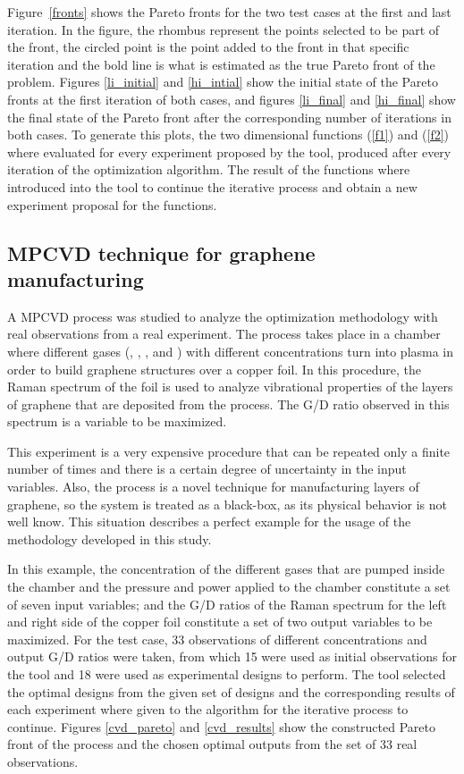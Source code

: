 \documentclass{article}
\begin{document}
Figure~\ref{fronts} shows the Pareto fronts for the two test cases at the first and last iteration. In the figure, the rhombus represent the points selected to be part of the front, the circled point is the point added to the front in that specific iteration and the bold line is what is estimated as the true Pareto front of the problem. Figures \ref{li_initial} and \ref{hi_intial} show the initial state of the Pareto fronts at the first iteration of both cases, and figures \ref{li_final} and \ref{hi_final} show the final state of the Pareto front after the corresponding number of iterations in both cases. To generate this plots, the two dimensional functions (\ref{f1}) and (\ref{f2}) where evaluated for every experiment proposed by the tool, produced after every iteration of the optimization algorithm. The result of the functions where introduced into the tool to continue the iterative process and obtain a new experiment proposal for the functions.

\subsection{MPCVD technique for graphene manufacturing}

A MPCVD process was studied to analyze the optimization methodology with real observations from a real experiment. The process takes place in a chamber where different gases (, , ,  and ) with different concentrations turn into plasma in order to build graphene structures over a copper foil. In this procedure, the Raman spectrum of the foil is used to analyze vibrational properties of the layers of graphene that are deposited from the process. The G/D ratio observed in this spectrum is a variable to be maximized.

This experiment is a very expensive procedure that can be repeated only a finite number of times and there is a certain degree of uncertainty in the input variables. Also, the process is a novel technique for manufacturing layers of graphene, so the system is treated as a black-box, as its physical behavior is not well know. This situation describes a perfect example for the usage of the methodology developed in this study.

In this example, the concentration of the different gases that are pumped inside the chamber and the pressure and power applied to the chamber constitute a set of seven input variables; and the G/D ratios of the Raman spectrum for the left and right side of the copper foil constitute a set of two output variables to be maximized. For the test case, 33 observations of different concentrations and output G/D ratios were taken, from which 15 were used as initial observations for the tool and 18 were used as experimental designs to perform. The tool selected the optimal designs from the given set of designs and the corresponding results of each experiment where given to the algorithm for the iterative process to continue. Figures \ref{cvd_pareto} and \ref{cvd_results} show the constructed Pareto front of the process and the chosen optimal outputs from the set of 33 real observations.
\end{document}
